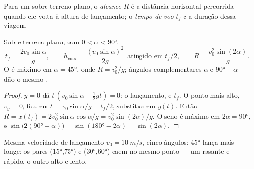 \begin{definition}[Alcance]\label{def:g12:projectile-motion:range}
Para um  sobre terreno plano, o \emph{alcance} $R$ é a
distância horizontal percorrida quando ele volta à altura de lançamento; o
\emph{tempo de voo} $t_f$ é a duração dessa viagem.
\end{definition}

\begin{proposition}\label{prop:g12:projectile-motion:range}
Sobre terreno plano, com $0 < \alpha < \ang{90}$:
\[
t_f = \frac{2 v_0 \sin\alpha}{g}, \qquad
h_{\text{max}} = \frac{(v_0\sin\alpha)^2}{2g}
\ \ \text{atingido em } t_f/2, \qquad
R = \frac{v_0^2 \sin(2\alpha)}{g}.
\]
O  é máximo em $\alpha = \ang{45}$, onde $R = v_0^2/g$; ângulos complementares
$\alpha$ e $\ang{90} - \alpha$ dão o mesmo .
\end{proposition}

\begin{proof}
$y = 0$ dá $t\,(v_0\sin\alpha - \tfrac12 gt) = 0$: o lançamento, e $t_f$. O ponto mais
alto, $v_y = 0$, fica em $t = v_0\sin\alpha/g = t_f/2$; substitua em $y(t)$. Então
$R = x(t_f) = 2v_0^2\sin\alpha\cos\alpha/g = v_0^2\sin(2\alpha)/g$. O seno é máximo em
$2\alpha = \ang{90}$, e $\sin\bigl(2(\ang{90}-\alpha)\bigr) = \sin(\ang{180} -
2\alpha) = \sin(2\alpha)$.
\end{proof}

\begin{omfigure}

{\small Mesma velocidade de lançamento $v_0 = \qty{10}{m/s}$, cinco ângulos: \ang{45}
lança mais longe; os pares (\ang{15},\ang{75}) e (\ang{30},\ang{60}) caem no mesmo
ponto --- um rasante e rápido, o outro alto e lento.}
\end{omfigure}

